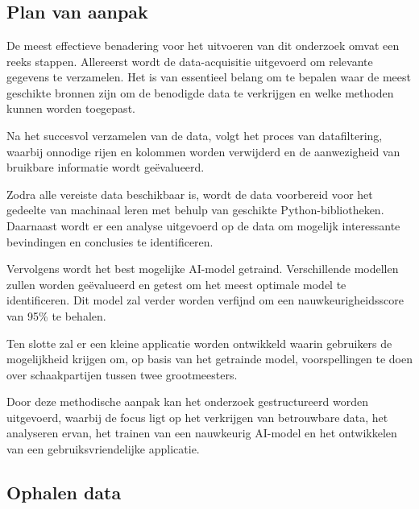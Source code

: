 
\chapter{}
\label{ch:methodologie}

\section{Plan van aanpak}


De meest effectieve benadering voor het uitvoeren van dit onderzoek omvat een reeks stappen. Allereerst wordt de data-acquisitie uitgevoerd om relevante gegevens te verzamelen. Het is van essentieel belang om te bepalen waar de meest geschikte bronnen zijn om de benodigde data te verkrijgen en welke methoden kunnen worden toegepast.

Na het succesvol verzamelen van de data, volgt het proces van datafiltering, waarbij onnodige rijen en kolommen worden verwijderd en de aanwezigheid van bruikbare informatie wordt geëvalueerd.

Zodra alle vereiste data beschikbaar is, wordt de data voorbereid voor het gedeelte van machinaal leren met behulp van geschikte Python-bibliotheken. Daarnaast wordt er een analyse uitgevoerd op de data om mogelijk interessante bevindingen en conclusies te identificeren.

Vervolgens wordt het best mogelijke AI-model getraind. Verschillende modellen zullen worden geëvalueerd en getest om het meest optimale model te identificeren. Dit model zal verder worden verfijnd om een nauwkeurigheidsscore van 95\% te behalen.

Ten slotte zal er een kleine applicatie worden ontwikkeld waarin gebruikers de mogelijkheid krijgen om, op basis van het getrainde model, voorspellingen te doen over schaakpartijen tussen twee grootmeesters.

Door deze methodische aanpak kan het onderzoek gestructureerd worden uitgevoerd, waarbij de focus ligt op het verkrijgen van betrouwbare data, het analyseren ervan, het trainen van een nauwkeurig AI-model en het ontwikkelen van een gebruiksvriendelijke applicatie.

\section{Ophalen data}

